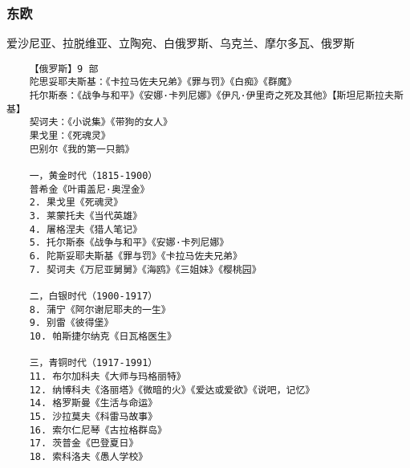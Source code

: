 \documentclass[UTF8]{../RepresentationUniverse}
\begin{document}
\subsubsection{东欧}
爱沙尼亚、拉脱维亚、立陶宛、白俄罗斯、乌克兰、摩尔多瓦、俄罗斯
\begin{lstlisting}
    【俄罗斯】9 部 
    陀思妥耶夫斯基：《卡拉马佐夫兄弟》《罪与罚》《白痴》《群魔》
    托尔斯泰：《战争与和平》《安娜·卡列尼娜》《伊凡·伊里奇之死及其他》【斯坦尼斯拉夫斯基】
    契诃夫：《小说集》《带狗的女人》
    果戈里：《死魂灵》
    巴别尔《我的第一只鹅》

    一，黄金时代（1815-1900）
    普希金《叶甫盖尼·奥涅金》
    2. 果戈里《死魂灵》
    3. 莱蒙托夫《当代英雄》
    4. 屠格涅夫《猎人笔记》
    5. 托尔斯泰《战争与和平》《安娜·卡列尼娜》
    6. 陀斯妥耶夫斯基《罪与罚》《卡拉马佐夫兄弟》
    7. 契诃夫《万尼亚舅舅》《海鸥》《三姐妹》《樱桃园》
    
    二，白银时代（1900-1917）
    8. 蒲宁《阿尔谢尼耶夫的一生》
    9. 别雷《彼得堡》
    10. 帕斯捷尔纳克《日瓦格医生》
    
    三，青铜时代（1917-1991）
    11. 布尔加科夫《大师与玛格丽特》
    12. 纳博科夫《洛丽塔》《微暗的火》《爱达或爱欲》《说吧，记忆》
    14. 格罗斯曼《生活与命运》
    15. 沙拉莫夫《科雷马故事》
    16. 索尔仁尼琴《古拉格群岛》
    17. 茨普金《巴登夏日》
    18. 索科洛夫《愚人学校》




\end{lstlisting}
\end{document}
